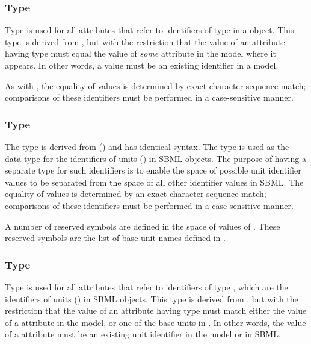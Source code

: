 \subsubsection{Type }
\label{sec:sidref}

Type  is used for all attributes that refer to
identifiers of type  in a \Model object.  This type is
derived from , but with the restriction that the
value of an attribute having type  must equal the
value of \emph{some}  attribute in the model where
it appears.  In other words, a  value must be an
existing identifier in a model.

As with , the equality of  values
is determined by exact character sequence match; \ie comparisons
of these identifiers must be performed in a case-sensitive manner.


\subsubsection{Type }
\label{sec:unitsid}

The type  is derived from 
() and has identical syntax.  The
 type is used as the data type for the
identifiers of units ()
in SBML objects.  The purpose of having a separate type for such
identifiers is to enable the space of possible unit identifier
values to be separated from the space of all other identifier
values in SBML.  The equality of  values is
determined by an exact character sequence match; \ie comparisons
of these identifiers must be performed in a case-sensitive manner.

A number of reserved symbols are defined in the space of values of
.  These reserved symbols are the list of base
unit names defined in .


\subsubsection{Type }
\label{sec:unitsidref}

Type  is used for all attributes that refer
to identifiers of type , which are the
identifiers of units ()
in SBML objects.  This type is derived from ,
but with the restriction that the value of an attribute having
type  must match either the value of a
 attribute in the model, or one of the
base units in .  In other words,
the value of a  attribute must be an existing
unit identifier in the model or in SBML.


